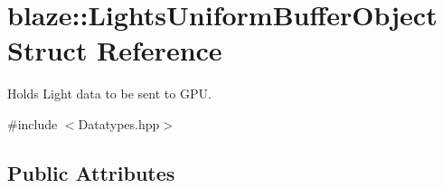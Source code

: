 \hypertarget{structblaze_1_1LightsUniformBufferObject}{}\section{blaze\+:\+:Lights\+Uniform\+Buffer\+Object Struct Reference}
\label{structblaze_1_1LightsUniformBufferObject}


Holds Light data to be sent to G\+PU.  




{\ttfamily \#include $<$Datatypes.\+hpp$>$}

\subsection*{Public Attributes}
